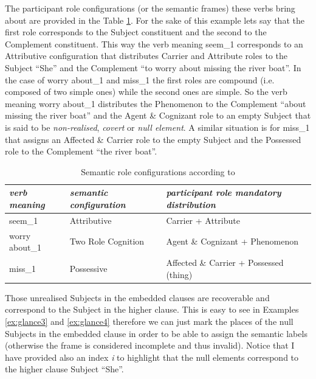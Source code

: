 The participant role configurations (or the semantic frames) these verbs bring about are provided in the Table \ref{tab:semantic-role-distro}. For the sake of this example lets say that the first role corresponds to the Subject constituent and the second to the Complement constituent. This way the verb meaning seem_{1} corresponds to an Attributive configuration that distributes Carrier and Attribute roles to the Subject ``She'' and the Complement ``to worry about missing the river boat''. In the case of worry about_1 and miss_1 the first roles are compound (i.e. composed of two simple ones) while the second ones are simple. So the verb meaning worry about_1 distributes the Phenomenon to the Complement ``about missing the river boat'' and the Agent \& Cognizant role to an empty Subject that is said to be \textit{non-realised}, \textit{covert} or \textit{null element}. A similar situation is for miss_1 that assigns an Affected \& Carrier role to the empty Subject and the Possessed role to the Complement ``the river boat''. 

\begin{table}[!ht]
    \centering
    \begin{tabular}{|l|l|l|}
        \hline
        \textit{verb meaning} & \textit{semantic configuration} & \textit{participant role mandatory distribution}  \\ \hline
        seem_{1}           & Attributive                     & Carrier + Attribute                     \\ \hline
        worry about_{1}   & Two Role Cognition              & Agent \& Cognizant + Phenomenon         \\ \hline
        miss_{1}           & Possessive                      & Affected \& Carrier + Possessed (thing) \\ \hline
    \end{tabular}
    \caption{Semantic role configurations according to \citet{Neale2002,Fawcett2009}}
    \label{tab:semantic-role-distro}
\end{table}

Those unrealised Subjects in the embedded clauses are recoverable and correspond to the Subject in the higher clause. This is easy to see in Examples \ref{ex:glance3} and \ref{ex:glance4} therefore we can just mark the places of the null Subjects in the embedded clause in order to be able to assign the semantic labels (otherwise the frame is considered incomplete and thus invalid). Notice that I have provided also an index \textit{i} to highlight that the null elements correspond to the higher clause Subject ``She''. 

